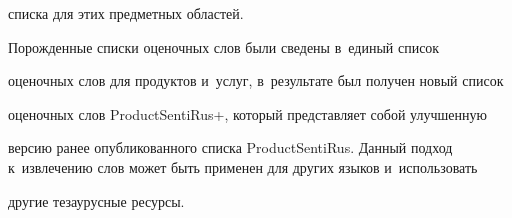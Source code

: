 списка для этих предметных областей.





     Порожденные списки оценочных слов были сведены в~единый список


оценочных слов для продуктов и~услуг, в~результате был получен новый список


оценочных слов ProductSentiRus+, который представляет собой улучшенную


версию ранее опубликованного списка ProductSentiRus. Данный подход к~извлечению слов может быть применен для других языков и~использовать


другие тезаурусные ресурсы.





\vspace*{-4pt}





